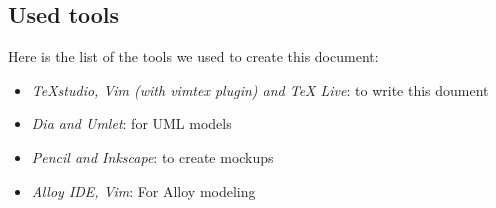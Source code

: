 \subsection{Used tools}
Here is the list of the tools we used to create this document:

\newcommand{\tool}[2]{
	\item 
		\textit{ #1}: #2	
}


\begin{itemize}
    \tool {TeXstudio, Vim (with vimtex plugin) and TeX Live}{to write this doument}
	\tool {Dia and Umlet}{for UML models}
	\tool{Pencil and Inkscape}{to create mockups}
	\tool{Alloy IDE, Vim}{For Alloy modeling}
\end{itemize}
